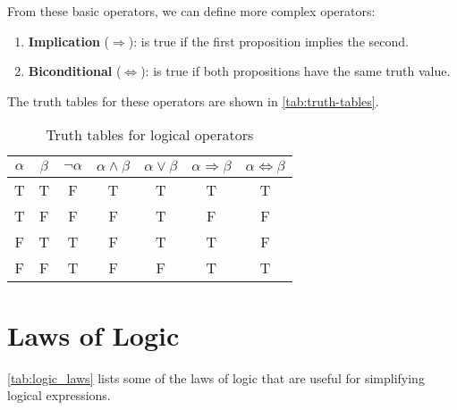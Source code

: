 \documentclass[oneside,11pt,dvipsnames]{book}
\renewcommand{\implies}{\Rightarrow}
\begin{document}
From these basic operators, we can define more complex operators:

\begin{enumerate}
\item \textbf{Implication} ($\Rightarrow$): is true if the first proposition implies the second. 
\item \textbf{Biconditional} ($\Leftrightarrow$): is true if both propositions have the same truth value. 
\end{enumerate}

The truth tables for these operators are shown in \autoref{tab:truth-tables}.

\begin{table}
    \caption{Truth tables for logical operators}\label{tab:truth-tables}
    \centering
\begin{tabular}{c|c|c|c|c|c|c}
    $\alpha$ & $\beta$ & $\neg \alpha$ & $\alpha \land \beta$ & $\alpha \lor \beta$ & $\alpha \implies \beta$ & $\alpha \Leftrightarrow \beta$ \\
    \midrule
    T & T & F & T & T & T & T \\
    T & F & F & F & T & F & F \\
    F & T & T & F & T & T & F \\
    F & F & T & F & F & T & T
\end{tabular}
\end{table}
\section{Laws of Logic}\label{sec:logic-laws}
\autoref{tab:logic_laws} lists some of the laws of logic that are useful for  simplifying logical expressions.
\end{document}
